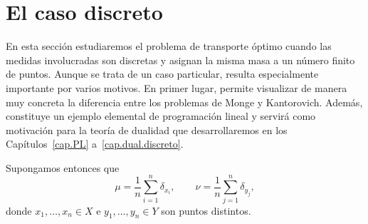 \documentclass[12pt, a4paper]{amsbook}
\newcommand{\XX}{{\mathbf X}}
\newcommand{\YY}{{\mathbf Y}}
\theoremstyle{remark}
\theoremstyle{definition}
\newtheorem{defi}[teo]{Definición}
\numberwithin{section}{chapter}
\numberwithin{subsection}{section}
\numberwithin{equation}{section}
\numberwithin{figure}{chapter}
\begin{document}
%
%
%

\section{El caso discreto}\label{sec.intro.discreto}

En esta sección estudiaremos el problema de transporte óptimo cuando las medidas involucradas son discretas y asignan la misma masa a un número finito de puntos. Aunque se trata de un caso particular, resulta especialmente importante por varios motivos. En primer lugar, permite visualizar de manera muy concreta la diferencia entre los problemas de Monge y Kantorovich. Además, constituye un ejemplo elemental de programación lineal y servirá como motivación para la teoría de dualidad que desarrollaremos en los Capítulos~\ref{cap.PL} a~\ref{cap.dual.discreto}.

Supongamos entonces que
\[
\mu=\frac1n\sum_{i=1}^n\delta_{x_i},
\qquad
\nu=\frac1n\sum_{j=1}^n\delta_{y_j},
\]
donde \(x_1,\dots,x_n\in X\) e \(y_1,\dots,y_n\in Y\) son puntos distintos.
\end{document}
